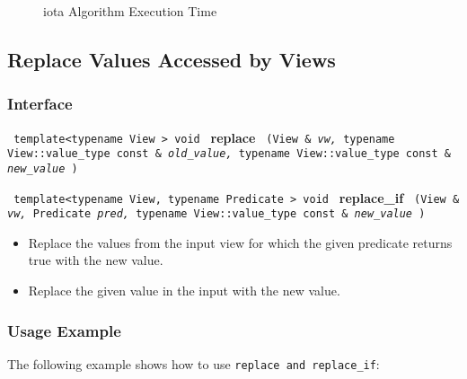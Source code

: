 \begin{figure}[p]
\caption{iota Algorithm Execution Time}
\label{fig:iota-alg-exec-exper}
\end{figure}


\subsection{Replace Values Accessed by Views} \label{sec-muta-replace}

\subsubsection{Interface} %

\noindent
\texttt{%
template<typename View >
\newline
void 
}
\newline
\textbf{replace}%
\texttt{%
(View \&
\textit{vw,}%
typename View::value\_type const \&
\textit{old\_value,}%
typename View::value\_type const \&
\textit{new\_value}%
)
}
\vspace{0.4cm}

\noindent
\texttt{%
template<typename View, typename Predicate >
\newline
void 
}
\newline
\textbf{replace\_if}%
\texttt{%
(View \&
\textit{vw,}%
Predicate 
\textit{pred,}%
typename View::value\_type const \&
\textit{new\_value}%
)
}
\vspace{0.4cm}

\begin{itemize}
\item
Replace the values from the input view for which the given predicate returns true with the new value. 
\item
Replace the given value in the input with the new value. 
\end{itemize}
 
\subsubsection{Usage Example} %

The following example shows how to use \texttt{replace and replace\_if}:

 
